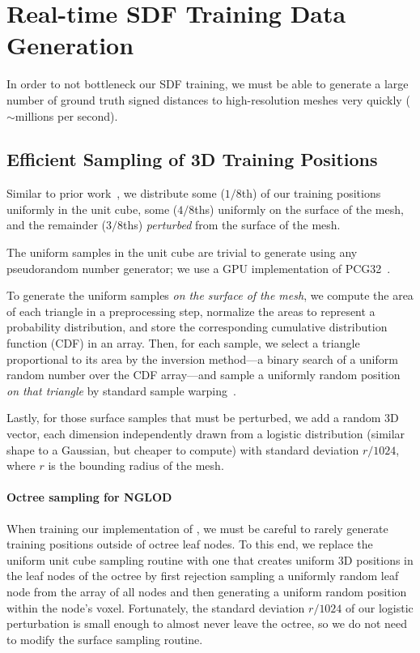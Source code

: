 \documentclass[acmtog,authorversion]{acmart}
\begin{document}
\section{Real-time SDF Training Data Generation}\label{app:sdf-datagen}

In order to not bottleneck our SDF training, we must be able to generate a large number of ground truth signed distances to high-resolution meshes very quickly ($\sim$millions per second).

\subsection{Efficient Sampling of 3D Training Positions}\label{app:sdf-training-samples}
Similar to prior work~\citep{takikawa2021nglod}, we distribute some (${1/8}$th) of our training positions uniformly in the unit cube, some (${4/8}$ths) uniformly on the surface of the mesh, and the remainder (${3/8}$ths) \emph{perturbed} from the surface of the mesh.

The uniform samples in the unit cube are trivial to generate using any pseudorandom number generator; we use a GPU implementation of PCG32~\citep{oneill:pcg2014}.

To generate the uniform samples \emph{on the surface of the mesh}, we compute the area of each triangle in a preprocessing step, normalize the areas to represent a probability distribution, and store the corresponding cumulative distribution function (CDF) in an array.
Then, for each sample, we select a triangle proportional to its area by the inversion method---a binary search of a uniform random number over the CDF array---and sample a uniformly random position \emph{on that triangle} by standard sample warping~\citep{PBRT3e}.

Lastly, for those surface samples that must be perturbed, we add a random 3D vector, each dimension independently drawn from a logistic distribution (similar shape to a Gaussian, but cheaper to compute) with standard deviation $r/1024$, where $r$ is the bounding radius of the mesh.

\paragraph{Octree sampling for NGLOD}
When training our implementation of \citet{takikawa2021nglod}, we must be careful to rarely generate training positions outside of octree leaf nodes.
To this end, we replace the uniform unit cube sampling routine with one that creates uniform 3D positions in the leaf nodes of the octree by first rejection sampling a uniformly random leaf node from the array of all nodes and then generating a uniform random position within the node's voxel.
Fortunately, the standard deviation $r/1024$ of our logistic perturbation is small enough to almost never leave the octree, so we do not need to modify the surface sampling routine.
\end{document}
